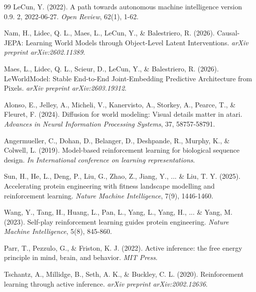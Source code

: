 \documentclass[12pt, a4paper]{article}
\begin{document}
\begin{thebibliography}{99}
LeCun, Y. (2022). \newblock A path towards autonomous machine intelligence version 0.9. 2, 2022-06-27. \newblock \textit{Open Review}, 62(1), 1-62.


Nam, H., Lidec, Q. L., Maes, L., LeCun, Y., \& Balestriero, R. (2026). \newblock Causal-JEPA: Learning World Models through Object-Level Latent Interventions. \newblock \textit{arXiv preprint arXiv:2602.11389}.


Maes, L., Lidec, Q. L., Scieur, D., LeCun, Y., \& Balestriero, R. (2026). \newblock LeWorldModel: Stable End-to-End Joint-Embedding Predictive Architecture from Pixels. \newblock \textit{arXiv preprint arXiv:2603.19312}.


Alonso, E., Jelley, A., Micheli, V., Kanervisto, A., Storkey, A., Pearce, T., \& Fleuret, F. (2024). \newblock Diffusion for world modeling: Visual details matter in atari. \newblock \textit{Advances in Neural Information Processing Systems}, 37, 58757-58791.


Angermueller, C., Dohan, D., Belanger, D., Deshpande, R., Murphy, K., \& Colwell, L. (2019). \newblock Model-based reinforcement learning for biological sequence design. \newblock \textit{In International conference on learning representations}.


Sun, H., He, L., Deng, P., Liu, G., Zhao, Z., Jiang, Y., ... \& Liu, T. Y. (2025). \newblock Accelerating protein engineering with fitness landscape modelling and reinforcement learning. \newblock \textit{Nature Machine Intelligence}, 7(9), 1446-1460.


Wang, Y., Tang, H., Huang, L., Pan, L., Yang, L., Yang, H., ... \& Yang, M. (2023). \newblock Self-play reinforcement learning guides protein engineering. \newblock \textit{Nature Machine Intelligence}, 5(8), 845-860.


Parr, T., Pezzulo, G., \& Friston, K. J. (2022). \newblock Active inference: the free energy principle in mind, brain, and behavior. \newblock \textit{MIT Press}.


Tschantz, A., Millidge, B., Seth, A. K., \& Buckley, C. L. (2020). \newblock Reinforcement learning through active inference. \newblock \textit{arXiv preprint arXiv:2002.12636}.



\end{thebibliography}
\end{document}
